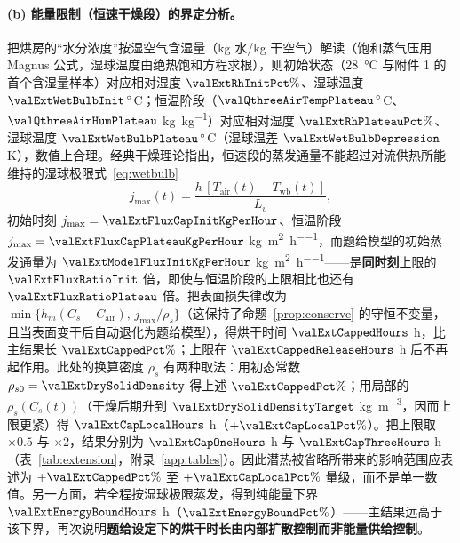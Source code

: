 \paragraph{(b) 能量限制（恒速干燥段）的界定分析。} 把烘房的“水分浓度”按湿空气含湿量（\si{\kilo\gram} 水/\si{\kilo\gram} 干空气）解读（饱和蒸气压用 Magnus 公式\cite{alduchov1996}，湿球温度由绝热饱和方程求根\cite{ashrae2017}），则初始状态（\SI{28}{\celsius} 与附件 1 的首个含湿量样本）对应相对湿度 $\valExtRhInitPct\%$、湿球温度 $\valExtWetBulbInit\,^\circ$C；恒温阶段（$\valQthreeAirTempPlateau\,^\circ$C、$\valQthreeAirHumPlateau$ \si{\kilo\gram\per\kilo\gram}）对应相对湿度 $\valExtRhPlateauPct\%$、湿球温度 $\valExtWetBulbPlateau\,^\circ$C（湿球温差 $\valExtWetBulbDepression$ \si{\kelvin}），数值上合理。经典干燥理论\cite{sherwood1929,mujumdar2014}指出，恒速段的蒸发通量不能超过对流供热所能维持的湿球极限式~\eqref{eq:wetbulb}
\begin{equation}
j_{\max}(t)=\frac{h\,[T_{\mathrm{air}}(t)-T_{\mathrm{wb}}(t)]}{L_v},
\label{eq:wetbulb}
\end{equation}
初始时刻 $j_{\max}=\valExtFluxCapInitKgPerHour$、恒温阶段 $j_{\max}=\valExtFluxCapPlateauKgPerHour$ \si{\kilo\gram\per\square\meter\per\hour}，而题给模型的初始蒸发通量为 $\valExtModelFluxInitKgPerHour$ \si{\kilo\gram\per\square\meter\per\hour}——是\textbf{同时刻}上限的 $\valExtFluxRatioInit$ 倍，即使与恒温阶段的上限相比也还有 $\valExtFluxRatioPlateau$ 倍。把表面损失律改为 $\min\{h_m(C_s-C_{\mathrm{air}}),\,j_{\max}/\rho_s\}$（这保持了命题~\ref{prop:conserve} 的守恒不变量，且当表面变干后自动退化为题给模型），得烘干时间 $\valExtCappedHours$ h，比主结果长 $\valExtCappedPct\%$；上限在 $\valExtCappedReleaseHours$ h 后不再起作用。此处的换算密度 $\rho_s$ 有两种取法：用初态常数 $\rho_{s0}=\valExtDrySolidDensity$ 得上述 $\valExtCappedPct\%$；用局部的 $\rho_s(C_s(t))$（干燥后期升到 $\valExtDrySolidDensityTarget$ \si{\kilo\gram\per\cubic\meter}，因而上限更紧）得 $\valExtCapLocalHours$ h（$+\valExtCapLocalPct\%$）。把上限取 $\times0.5$ 与 $\times2$，结果分别为 $\valExtCapOneHours$ h 与 $\valExtCapThreeHours$ h（表~\ref{tab:extension}，附录~\ref{app:tables}）。因此潜热被省略所带来的影响范围应表述为 $+\valExtCappedPct\%$ 至 $+\valExtCapLocalPct\%$ 量级，而不是单一数值。另一方面，若全程按湿球极限蒸发，得到纯能量下界 $\valExtEnergyBoundHours$ h（$\valExtEnergyBoundPct\%$）——主结果远高于该下界，再次说明\textbf{题给设定下的烘干时长由内部扩散控制而非能量供给控制}。

